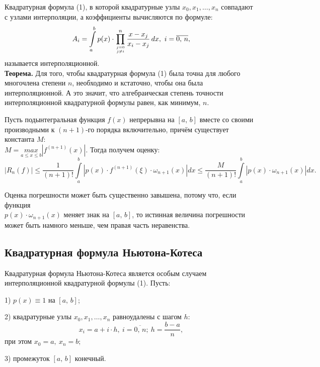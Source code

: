 \documentclass[14pt,a4paper,titlepage]{extarticle}
\begin{document}
Квадратурная формула (1), в которой квадратурные узлы $x_0, x_1,\ldots, x_n$ совпадают с узлами интерполяции, а коэффициенты вычисляются по формуле:
\begin{equation}
A_i=\int\limits_a^b p(x)\cdot\prod_{\genfrac{}{}{0pt}{}{j=0}{j\neq i}}^n\frac{x-x_j}{x_i-x_j}\, dx,\ i=\overline{0,\, n},
\end{equation}
называется интерполяционной.\\
{\bf Теорема.} Для того, чтобы квадратурная формула (1) была точна для любого многочлена степени $n$, необходимо и кстаточно, чтобы она была интерполяционной. А это значит, что алгебраическая степень точности интерполяционной квадратурной формулы равен, как минимум, $n$.

Пусть подынтегральная функция $f(x)$ непрерывна на $[a,\, b]$ вместе со своими производными к $(n+1)$-го порядка включительно, причём существует константа $M$:\\$M=\underset{a\leqslant x\leqslant b}{max}\left| f^{(n+1)}(x)\right|.$ Тогда получем оценку:
$$\left| R_n(f)\right|\leqslant\frac{1}{(n+1)!}\int\limits_a^b\left| p(x)\cdot f^{(n+1)}(\xi)\cdot\omega _{n+1}(x)\right| dx\leqslant\frac{M}{(n+1)!}\int\limits_a^b\left| p(x)\cdot\omega _{n+1}(x)\right| dx.$$

Оценка погрешности может быть существенно завышена, потому что, если функция\\ $p(x)\cdot\omega _{n+1}(x)$ меняет знак на $[a,\, b]$, то истинная величина погрешности может быть намного меньше, чем правая часть неравенства.

{\centering\subsection{Квадратурная формула Ньютона-Котеса}}

Квадратурная формула Ньютона-Котеса является особым случаем интерполяционной квадратурной формулы (1). Пусть:

1) $p(x)\equiv 1$ на $[a,\, b]$; 

2) квадратурные узлы $x_0, x_1,\ldots, x_n$ равноудалены с шагом $h$:
\begin{equation}
x_i=a+i\cdot h,\ i=\overline{0,\, n};\ h=\frac{b-a}{n},
\end{equation}
при этом $x_0=a,\ x_n=b;$

3) промежуток $[a,\, b]$ конечный.
\end{document}
